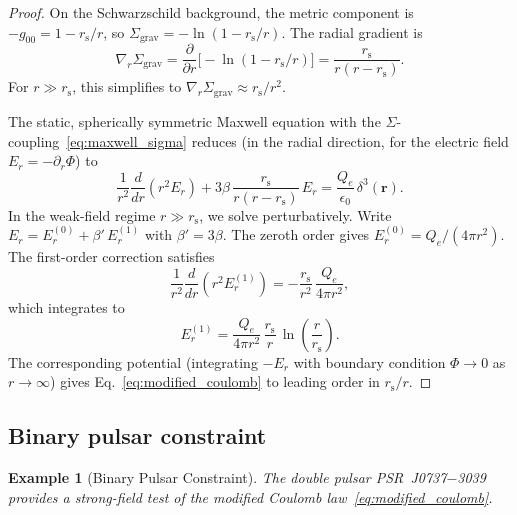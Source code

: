 \documentclass[letterpaper,twocolumn,superscriptaddress,longbibliography]{revtex4-2}
\newtheorem{example}{Example}[section]
\newcommand{\rs}{r_{\mathrm{s}}}
\newcommand{\Sgrav}{\Sigma_{\mathrm{grav}}}
\begin{document}
\begin{proof}
On the Schwarzschild background, the metric component is
$-g_{00} = 1 - \rs/r$, so
$\Sgrav = -\ln(1 - \rs/r)$.  The radial gradient is
\begin{equation}
  \nabla_r\Sgrav
  = \frac{\partial}{\partial r}\bigl[-\ln(1-\rs/r)\bigr]
  = \frac{\rs}{r(r - \rs)}.
  \label{eq:grad_Sigma_Schw}
\end{equation}
For $r \gg \rs$, this simplifies to
$\nabla_r\Sgrav \approx \rs/r^2$.

The static, spherically symmetric Maxwell equation with the
$\Sigma$-coupling~\eqref{eq:maxwell_sigma} reduces (in the
radial direction, for the electric field
$E_r = -\partial_r\Phi$) to
\begin{equation}
  \frac{1}{r^2}\frac{d}{dr}\!\left(r^2 E_r\right)
  + 3\beta\,\frac{\rs}{r(r-\rs)}\,E_r
  = \frac{Q_e}{\epsilon_0}\,\delta^3(\bm{r}).
  \label{eq:radial_maxwell}
\end{equation}
In the weak-field regime $r \gg \rs$, we solve
perturbatively.  Write $E_r = E_r^{(0)} + \beta'\,E_r^{(1)}$
with $\beta' = 3\beta$.  The zeroth order gives
$E_r^{(0)} = Q_e/(4\pi r^2)$.  The first-order
correction satisfies
\begin{equation}
  \frac{1}{r^2}\frac{d}{dr}\!\left(r^2 E_r^{(1)}\right)
  = -\frac{\rs}{r^2}\,\frac{Q_e}{4\pi r^2},
  \label{eq:E1_eq}
\end{equation}
which integrates to
\begin{equation}
  E_r^{(1)} = \frac{Q_e}{4\pi r^2}\,\frac{\rs}{r}\,
  \ln\!\left(\frac{r}{\rs}\right).
  \label{eq:E1_sol}
\end{equation}
The corresponding potential (integrating $-E_r$ with
boundary condition $\Phi \to 0$ as $r \to \infty$) gives
Eq.~\eqref{eq:modified_coulomb} to leading order in
$\rs/r$.
\end{proof}

\subsection{Binary pulsar constraint}
\label{sec:pulsar}

\begin{example}[Binary Pulsar Constraint]
\label{ex:pulsar}
The double pulsar PSR~J0737$-$3039~\cite{Kramer2006}
provides a strong-field test of the modified Coulomb
law~\eqref{eq:modified_coulomb}.
\end{example}
\end{document}
